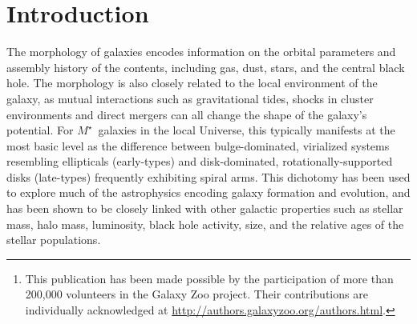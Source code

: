 \documentclass[twocolumn]{aastex6}
\begin{document}
\begin{abstract}

We present the data release paper for the Galaxy Zoo: Hubble (GZH) project.\footnote{This publication has been made possible by the participation of more than 200,000 volunteers in the Galaxy Zoo project. Their contributions are individually acknowledged at \url{http://authors.galaxyzoo.org/authors.html}.} This is the third phase in a large effort to measure reliable morphologies of galaxies on detailed scales by using crowdsourced visual classifications of color composite image. Images in GZH are selected from various \textit{Hubble Space Telescope} Legacy programs using the Advanced Camera for Surveys (AEGIS, COSMOS, GEMS, GOODS-N, and GOODS-S), with filters selected to probe the rest-frame optical emission from galaxies out to $z\simeq1$. The galaxies selected for GZH classifications go down to magnitude limits of $m_{I}<23.5$ and have a median redshift of $\langle z\rangle=0.9\pm0.6$, with a tail extending out to $z\simeq4$. The GZH morphological data includes measurements of both bulge- and disk-dominated galaxies, details on spiral disk structure that relate to the Hubble type, and numerous measurements of clump identification and geometry. We also describe and employ a novel method for calibrating morphological bias by using artificially-redshifted galaxy images as a baseline. This paper presents both the raw and calibrated morphological vote fractions for $150,771$ galaxies, constituting a large data set suitable for large-scale studies of galaxy evolution. 

\end{abstract}


\section{Introduction} \label{sec:intro}

The morphology of galaxies encodes information on the orbital parameters and assembly history of the contents, including gas, dust, stars, and the central black hole. The morphology is also closely related to the local environment of the galaxy, as mutual interactions such as gravitational tides, shocks in cluster environments and direct mergers can all change the shape of the galaxy's potential. For $M^\star$~galaxies in the local Universe, this typically manifests at the most basic level as the difference between bulge-dominated, virialized systems resembling ellipticals (early-types) and disk-dominated, rotationally-supported disks (late-types) frequently exhibiting spiral arms. This dichotomy has been used to explore much of the astrophysics encoding galaxy formation and evolution, and has been shown to be closely linked with other galactic properties such as stellar mass, halo mass, luminosity, black hole activity, size, and the relative ages of the stellar populations. 
\end{document}
